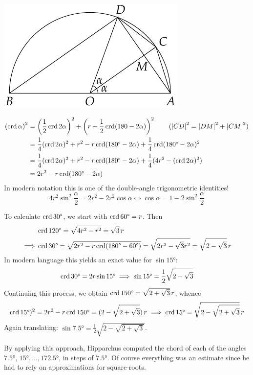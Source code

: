 \hfill
\begin{minipage}[t]{0.39\linewidth}\vspace{0pt}
	\flushright\includegraphics[scale=0.95]{trig-double}
\end{minipage}
\begin{align*}
	\left(\crd\alpha\right)^2&=\left(\frac 12\crd 2\alpha\right)^2+\left(r-\frac 12\crd(180-2\alpha)\right)^2 \tag{$\nm{CD}^2=\nm{DM}^2+\nm{CM}^2$}\\
	&=\frac 14(\crd 2\alpha)^2+r^2-r\crd(\ang{180}-2\alpha)+\frac 14\crd(\ang{180}-2\alpha)^2\\
	&=\frac 14(\crd 2\alpha)^2+r^2-r\crd(\ang{180}-2\alpha)+\frac 14(4r^2-(\crd 2\alpha)^2)\\
	&=2r^2-r\crd(\ang{180}-2\alpha)
\end{align*}
In modern notation this is one of the double-angle trigonometric identities!
\[
	4r^2\sin^2\frac\alpha 2 =2r^2-2r^2\cos\alpha\iff \cos\alpha=1-2\sin^2\frac\alpha 2
\]
\goodbreak


 To calculate $\crd \ang{30}$, we start with $\crd\ang{60}=r$. Then
\begin{align*}
	&\crd\ang{120}=\sqrt{4r^2-r^2}=\sqrt 3\,r\\
	\implies &\crd\ang{30}=\sqrt{2r^2-r\crd(\ang{180}-\ang{60})}=\sqrt{2r^2-\sqrt 3r^2}=\sqrt{2-\sqrt 3}\,r
\end{align*}
In modern language this yields an exact value for $\sin\ang{15}$:
\[
	\crd\ang{30}=2r\sin\ang{15}\implies\sin\ang{15} =\frac 12\sqrt{2-\sqrt 3}
\]
Continuing this process, we obtain $\crd \ang{150}=\sqrt{2+\sqrt 3}\,r$, whence
\[
	\crd\ang{15})^2=2r^2-r\crd\ang{150}=(2-\sqrt{2+\sqrt 3})\,r\implies \crd\ang{15}=\sqrt{2-\sqrt{2+\sqrt 3}}\,r
\]
Again translating: $\sin\ang{7.5}=\frac 12\sqrt{2-\sqrt{2+\sqrt 3}}$.\smallbreak

By applying this approach, Hipparchus computed the chord of each of the angles $\ang{7.5}$, $\ang{15},\ldots,\ang{172.5}$, in steps of $\ang{7.5}$. Of course everything was an estimate since he had to rely on approximations for square-roots.\smallbreak

